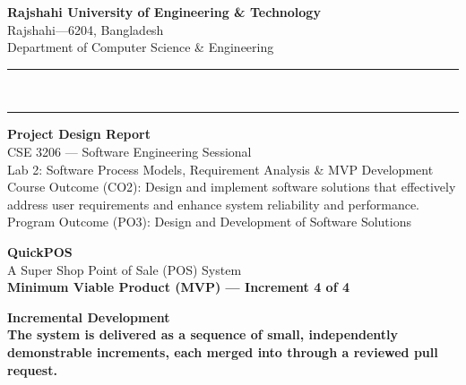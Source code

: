 \documentclass[11pt,a4paper]{article}
\newcommand{\filep}[1]{\texttt{\small\color{navy}\detokenize{#1}}}
\begin{document}
\color{ink}
\thispagestyle{empty}

\begin{center}
{\sffamily\bfseries\large\color{navy} Rajshahi University of Engineering \& Technology}\\[2pt]
{\sffamily\color{rulegray} Rajshahi---6204, Bangladesh}\\[1pt]
{\sffamily\color{rulegray} Department of Computer Science \& Engineering}\\[10pt]
\rule{\textwidth}{1.1pt}\\[-6pt]
\rule{\textwidth}{0.4pt}
\end{center}

\vspace{0.6cm}

\begin{center}
{\sffamily\bfseries\LARGE\color{navy} Project Design Report}\\[6pt]
{\sffamily\large\color{deepteal} CSE 3206 --- Software Engineering Sessional}\\[3pt]
{\sffamily\normalsize\color{ink} Lab 2: Software Process Models, Requirement Analysis \& MVP Development}\\[8pt]
{\footnotesize\sffamily\color{rulegray} Course Outcome (CO2): Design and implement software solutions that
effectively address user requirements and enhance system reliability and performance.}\\
{\footnotesize\sffamily\color{rulegray} Program Outcome (PO3): Design and Development of Software Solutions}
\end{center}

\vspace{0.5cm}

\begin{center}
\begin{minipage}{0.9\textwidth}
\centering
{\sffamily\bfseries\Huge\color{navy} QuickPOS}\\[4pt]
{\sffamily\Large\color{ink} A Super Shop Point of Sale (POS) System}\\[4pt]
{\sffamily\color{deepteal}\bfseries Minimum Viable Product (MVP) --- Increment 4 of 4}\\[10pt]
\begin{notebox}
\centering\sffamily\bfseries
\textbf{Incremental Development}\\[2pt]
{\normalfont\small The system is delivered as a sequence of small, independently
demonstrable increments, each merged into \filep{main} through a reviewed pull request.}
\end{notebox}
\end{minipage}
\end{center}
\end{document}
